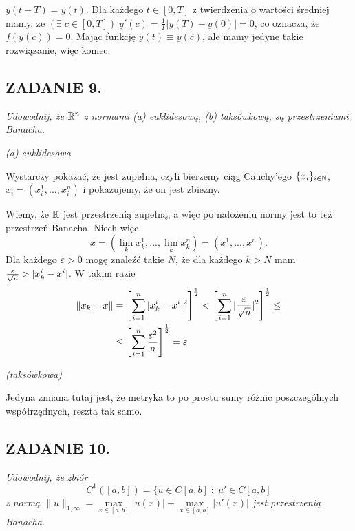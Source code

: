 \documentclass{article}
\begin{document}

$y(t+T)=y(t)$. Dla każdego $t\in[0,T]$ z twierdzenia o wartości średniej mamy, ze $(\exists\;c\in [0, T])\;y'(c)=\frac1{T}|y(T)-y(0)|=0$, co oznacza, że $f(y(c))=0$. Mając funkcję $y(t)\equiv y(c)$, ale mamy jedyne takie rozwiązanie, więc koniec.

\subsection*{ZADANIE 9.}
\emph{\color{purple}Udowodnij, że $\mathbb{R}^n$ z normami (a) euklidesową, (b) taksówkową, są przestrzeniami Banacha.}

\emph{\color{purple}(a) euklidesowa}

Wystarczy pokazać, że jest zupełna, czyli bierzemy ciąg Cauchy'ego $\{x_i\}_{i\in\mathbb{N}}$, $x_i=(x_i^1,...,x_i^n)$ i pokazujemy, że on jest zbieżny. 

Wiemy, że $\mathbb{R}$ jest przestrzenią zupełną, a więc po nałożeniu normy jest to też przestrzeń Banacha. Niech więc 
$$x=(\lim_k x_k^1,...,\lim_kx_k^n)=(x^1,...,x^n).$$
Dla każdego $\varepsilon>0$ mogę znaleźć takie $N$, że dla każdego $k>N$ mam ${\varepsilon\over \sqrt{n}}>|x_k^i-x^i|$. W takim razie
\begin{align*}
    \|x_k-x\|&=\left[\sum\limits_{i=1}^n|x_k^i-x^i|^2\right]^\frac12<\left[\sum\limits_{i=1}^n|{\varepsilon\over \sqrt{n}}|^2\right]^\frac12\leq\\
    &\leq \left[\sum\limits_{i=1}^n{\varepsilon^2\over n}\right]^\frac12=\varepsilon
\end{align*}

\emph{\color{purple}(taksówkowa)}

Jedyna zmiana tutaj jest, że metryka to po prostu sumy różnic poszczególnych współrzędnych, reszta tak samo.

\subsection*{ZADANIE 10.}
{\color{purple}\emph{Udowodnij, że zbiór}
$$C^1([a, b])=\{u\in C[a, b]\;:\;u'\in C[a, b]$$
\emph{z normą $\|u\|_{1,\infty}=\max\limits_{x\in [a, b]}|u(x)|+\max\limits_{x\in[a,b]}|u'(x)|$ jest przestrzenią Banacha. }}

\end{document}
